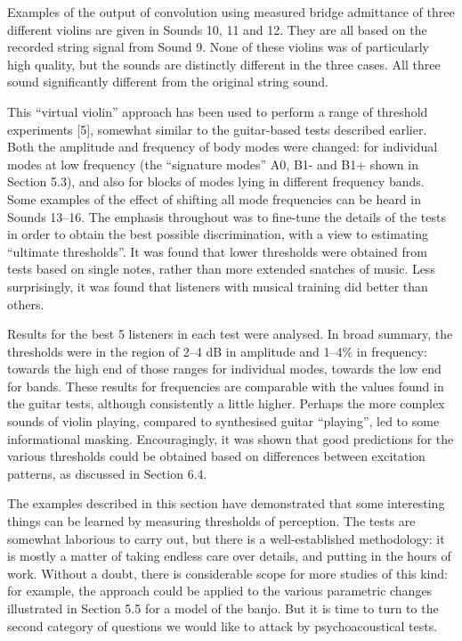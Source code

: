  Examples of the output of convolution using measured bridge admittance of 
  three different violins are given in Sounds 10, 11 and 12. They are all based 
  on the recorded string signal from Sound 9. None of these violins was of 
  particularly high quality, but the sounds are distinctly different in the 
  three cases. All three sound significantly different from the original string 
  sound. 

  This “virtual violin” approach has been used to perform a range of threshold 
  experiments [5], somewhat similar to the guitar-based tests described 
  earlier. Both the amplitude and frequency of body modes were changed: for 
  individual modes at low frequency (the “signature modes” A0, B1- and B1+ 
  shown in Section 5.3), and also for blocks of modes lying in different 
  frequency bands. Some examples of the effect of shifting all mode frequencies 
  can be heard in Sounds 13--16. The emphasis throughout was to fine-tune the 
  details of the tests in order to obtain the best possible discrimination, 
  with a view to estimating “ultimate thresholds”. It was found that lower 
  thresholds were obtained from tests based on single notes, rather than more 
  extended snatches of music. Less surprisingly, it was found that listeners 
  with musical training did better than others. 

  Results for the best 5 listeners in each test were analysed. In broad 
  summary, the thresholds were in the region of 2--4 dB in amplitude and 1--4\% 
  in frequency: towards the high end of those ranges for individual modes, 
  towards the low end for bands. These results for frequencies are comparable 
  with the values found in the guitar tests, although consistently a little 
  higher. Perhaps the more complex sounds of violin playing, compared to 
  synthesised guitar ``playing'', led to some informational masking. 
  Encouragingly, it was shown that good predictions for the various thresholds 
  could be obtained based on differences between excitation patterns, as 
  discussed in Section 6.4. 

  The examples described in this section have demonstrated that some 
  interesting things can be learned by measuring thresholds of perception. The 
  tests are somewhat laborious to carry out, but there is a well-established 
  methodology: it is mostly a matter of taking endless care over details, and 
  putting in the hours of work. Without a doubt, there is considerable scope 
  for more studies of this kind: for example, the approach could be applied to 
  the various parametric changes illustrated in Section 5.5 for a model of the 
  banjo. But it is time to turn to the second category of questions we would 
  like to attack by psychoacoustical tests. 



